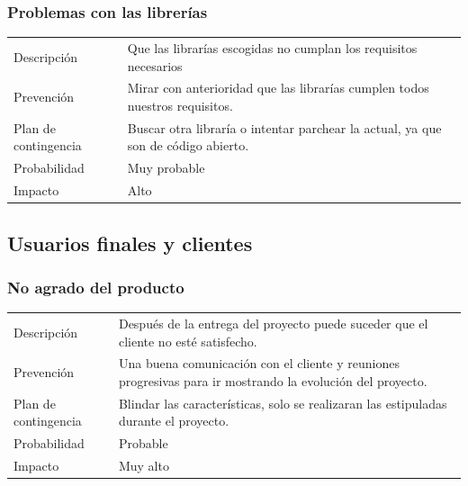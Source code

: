 \subsubsection{Problemas con las librer\'{i}as}
\begin{table}[H]
    \begin{center}
        \begin{tabular}{l p{8cm}}
            Descripci\'{o}n                 & Que las librar\'{i}as escogidas no cumplan los requisitos necesarios \\
            Prevenci\'{o}n                  & Mirar con anterioridad que las librar\'{i}as cumplen todos nuestros requisitos. \\ 
            Plan de contingencia            & Buscar otra librar\'{i}a o intentar parchear la actual, ya que son de c\'{o}digo 
            								  abierto. \\
            Probabilidad                    & Muy probable \\
            Impacto                         & Alto \\
        \end{tabular}
    \end{center}
    
\end{table}
\subsection{Usuarios finales y clientes}
\subsubsection{No agrado del producto}
\begin{table}[H]
    \begin{center}
        \begin{tabular}{l p{8cm}}
            Descripci\'{o}n                 & Despu\'{e}s de la entrega del proyecto puede suceder que el cliente no est\'{e} 
            								  satisfecho. \\
            Prevenci\'{o}n                  & Una buena comunicación con el cliente y reuniones progresivas para ir mostrando la 
            								  evolución del proyecto. \\ 
            Plan de contingencia            & Blindar las caracter\'{i}sticas, solo se realizaran las estipuladas durante el 
            							   	  proyecto. \\
            Probabilidad                    & Probable \\
            Impacto                         & Muy alto \\
        \end{tabular}
    \end{center}
    
\end{table}

